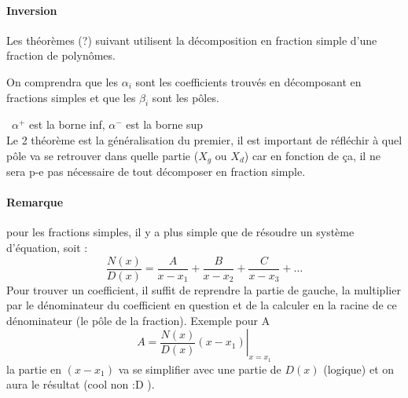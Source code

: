 \paragraph{Inversion}
Les théorèmes (?) suivant utilisent la décomposition en fraction simple d'une fraction de polynômes.
\begin{center}
\end{center}
On comprendra que les $\alpha_i$ sont les coefficients trouvés en décomposant en fractions simples et que les $\beta_i$ sont les pôles.
\begin{center}
\end{center}
\danger\ $\alpha^+$ est la borne inf, $\alpha^-$ est la borne sup\\
Le 2 théorème est la généralisation du premier, il est important de réfléchir à quel pôle va se retrouver dans quelle partie ($X_g$ ou $X_d$) car en fonction de ça, il ne sera p-e pas nécessaire de tout décomposer en fraction simple.
\paragraph{Remarque} pour les fractions simples, il y a plus simple que de résoudre un système d'équation, soit : $$\frac{N(x)}{D(x)}=\frac{A}{x-x_1}+\frac{B}{x-x_2}+\frac{C}{x-x_3}+\dots$$ Pour trouver un coefficient, il suffit de reprendre la partie de gauche, la multiplier par le dénominateur du coefficient en question et de la calculer en la racine de ce dénominateur (le pôle de la fraction). Exemple pour A $$A=\left.\frac{N(x)}{D(x)}(x-x_1)\right|_{x=x_1}$$
la partie en $(x-x_1)$ va se simplifier avec une partie de $D(x)$ (logique) et on aura le résultat (cool non :D ).
